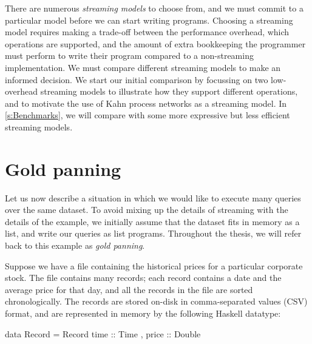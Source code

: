 There are numerous \emph{streaming models} to choose from, and we must commit to a particular model before we can start writing programs.
Choosing a streaming model requires making a trade-off between the performance overhead, which operations are supported, and the amount of extra bookkeeping the programmer must perform to write their program compared to a non-streaming implementation.
We must compare different streaming models to make an informed decision.
We start our initial comparison by focussing on two low-overhead streaming models to illustrate how they support different operations, and to motivate the use of Kahn process networks as a streaming model.
In \cref{s:Benchmarks}, we will compare with some more expressive but less efficient streaming models.

\section{Gold panning}
\label{taxonomy/gold-panning}
Let us now describe a situation in which we would like to execute many queries over the same dataset.
To avoid mixing up the details of streaming with the details of the example, we initially assume that the dataset fits in memory as a list, and write our queries as list programs.
Throughout the thesis, we will refer back to this example as \emph{gold panning}.

Suppose we have a file containing the historical prices for a particular corporate stock.
The file contains many records; each record contains a date and the average price for that day, and all the records in the file are sorted chronologically.
The records are stored on-disk in comma-separated values (CSV) format, and are represented in memory by the following Haskell datatype:

\begin{haskell}
data Record = Record
 { time  :: Time
 , price :: Double }
\end{haskell}

